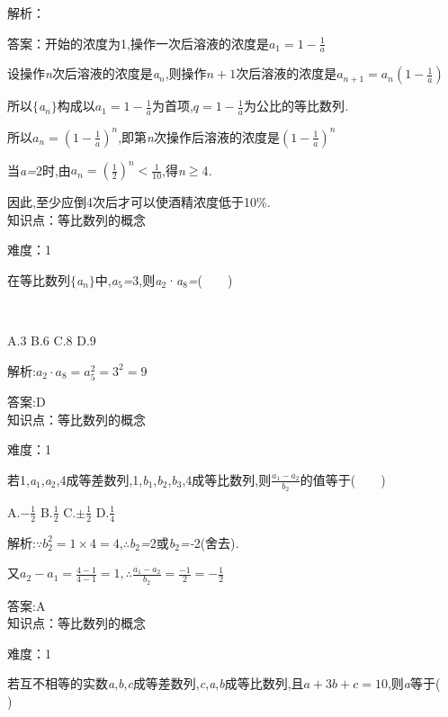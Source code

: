 \documentclass{article} %
\begin{document}
解析：

 答案：开始的浓度为1,操作一次后溶液的浓度是$a_1=1-\frac{1}{a}$

设操作\textit{n}次后溶液的浓度是\textit{a${}_{n}$},则操作$n+1$次后溶液的浓度是$a_{n+1}=a_n(1-\frac{1}{a})$

所以$\mathrm{\{}$\textit{a${}_{n}$}$\mathrm{\}}$构成以$a_1=1-\frac{1}{a}$为首项,$q=1-\frac{1}{a}$为公比的等比数列\textit{.}

所以$a_n=(1-\frac{1}{a})^n$,即第\textit{n}次操作后溶液的浓度是$(1-\frac{1}{a})^n$

当\textit{a=}2时,由$a_n=(\frac{1}{2})^n<\frac{1}{10}$,得\textit{n}$\mathrm{\ge}$4\textit{.}

因此,至少应倒4次后才可以使酒精浓度低于10\%\textit{.} \\

知识点：等比数列的概念

难度：1

 在等比数列$\mathrm{\{}$\textit{a${}_{n}$}$\mathrm{\}}$中,\textit{a}${}_{5}$\textit{=}3,则\textit{a}${}_{2}$·\textit{a}${}_{8}$\textit{=}(\textit{　　})

 \textit{　} \textit{　　　　　　} \textit{　　　　　　} \textit{　　　}

 A.3 B.6 C.8 D.9

 解析:$a_2\cdot a_8 =a_5^2=3^2=9$

 答案:D \\

知识点：等比数列的概念

难度：1

 若1,\textit{a}${}_{1}$,\textit{a}${}_{2}$,4成等差数列,1,\textit{b}${}_{1}$,\textit{b}${}_{2}$,\textit{b}${}_{3}$,4成等比数列,则$\frac{a_1-a_2}{b_2}$的值等于(\textit{　　})

 A.$-\frac{1}{2}$ B.$\frac{1}{2}$ C.$\pm \frac{1}{2}$ D.$\frac{1}{4}$

 解析:$\because b_2^2=1\times 4 = 4$,\textit{$\therefore$b}${}_{2}$\textit{=}2或\textit{b}${}_{2}$\textit{=-}2(舍去)\textit{.}

又$a_2-a_1=\frac{4-1}{4-1}=1,\therefore \frac{a_1-a_2}{b_2}=\frac{-1}{2}=-\frac{1}{2}$

 答案:A \\

知识点：等比数列的概念

难度：1

 若互不相等的实数\textit{a},\textit{b},\textit{c}成等差数列,\textit{c},\textit{a},\textit{b}成等比数列,且$a+3b+c=10$,则\textit{a}等于(\textit{　　})
\end{document}
